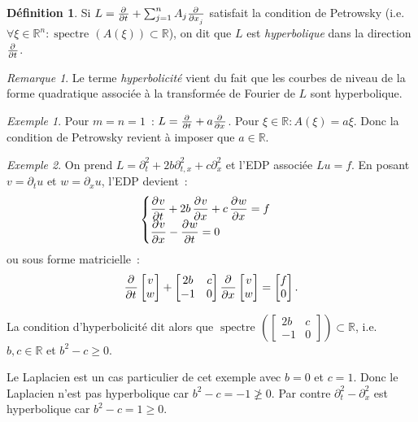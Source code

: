 \documentclass{report}
\DeclareMathOperator{\spectreOperator}{spectre\!}
\newcommand{\R}{{\mathbb R}}
\newcommand{\spectre}[1]{{\spectreOperator\left(#1\right)}}
\theoremstyle{definition}
\newtheorem{déf}[thm]{Définition}
\theoremstyle{remark}
\newtheorem*{rmq}{Remarque}
\newtheorem{ex}{Exemple}[chapter]
\begin{document}
\begin{déf} Si $L = \pd {}t + \sum_{j=1}^nA_j\pd {}{x_j}$ satisfait la condition de Petrowsky (i.e. $\forall \xi \in \R^n : \spectre {A(\xi)} \subset \R$), on dit que
$L$ est \textit{hyperbolique} dans la direction $\pd {}t$.
\end{déf}

\begin{rmq} Le terme \textit{hyperbolicité} vient du fait que les courbes de niveau de la forme quadratique associée à la transformée de Fourier de $L$ sont hyperbolique.
\end{rmq}

\begin{ex}
Pour $m=n=1$~: $L = \pd {}t + a\pd {}x$. Pour $\xi \in \R : A(\xi) = a\xi$. Donc la condition de Petrowsky revient à imposer que $a \in \R$.
\end{ex}

\begin{ex}
On prend $L = \partial^2_t + 2b\partial^2_{t,x} + c\partial^2_x$ et l'EDP associée $Lu = f$. En posant $v = \partial_t u$ et $w = \partial_x u$, l'EDP devient~:
\[\begin{cases}\dpd vt + 2b\dpd vx + c\dpd wx = f\\\dpd vx - \dpd wt = 0\end{cases}\]
ou sous forme matricielle~:
\[\dpd {}t\begin{bmatrix}v \\ w\end{bmatrix} + \begin{bmatrix}2b & c \\-1 & 0\end{bmatrix}\dpd {}x\begin{bmatrix}v \\ w\end{bmatrix} = \begin{bmatrix}f \\ 0\end{bmatrix}.\]

La condition d'hyperbolicité dit alors que $\spectre {\begin{bmatrix}2b & c \\-1 & 0\end{bmatrix}} \subset \R$, i.e. $b,c \in \R$ et $b^2-c \geq 0$.

Le Laplacien est un cas particulier de cet exemple avec $b=0$ et $c=1$. Donc le Laplacien n'est pas hyperbolique car $b^2-c = -1 \not \geq 0$.
Par contre $\partial_t^2 - \partial_x^2$ est hyperbolique car $b^2 - c = 1 \geq 0$.
\end{ex}
\end{document}
